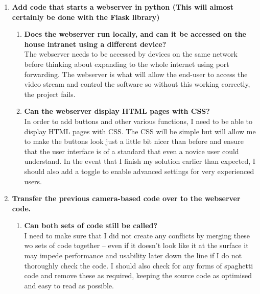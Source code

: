 \documentclass[9pt]{article}
\begin{document}
\begin{small}
\begin{enumerate}
		\item \textbf{Add code that starts a webserver in python (This will almost certainly be done with the Flask library)}
		\begin{enumerate}
			\item \textbf{Does the webserver run locally, and can it be accessed on the house intranet using a different device?}\\
				The webserver needs to be accessed by devices on the same network before thinking about expanding to the whole internet using port forwarding. The webserver is what will allow the end-user to access the video stream and control the software so without this working correctly, the project fails.
			\item \textbf{Can the webserver display HTML pages with CSS?}\\
				In order to add buttons and other various functions, I need to be able to display HTML pages with CSS. The CSS will be simple but will allow me to make the buttons look just a little bit nicer than before and ensure that the user interface is of a standard that even a novice user could understand. In the event that I finish my solution earlier than expected, I should also add a toggle to enable advanced settings for very experienced users.
		\end{enumerate}
		
		\item \textbf{Transfer the previous camera-based code over to the webserver code.}
		\begin{enumerate}
			\item \textbf{Can both sets of code still be called?}\\
				I need to make sure that I did not create any conflicts by merging these wo sets of code together – even if it doesn’t look like it at the surface it may impede performance and usability later down the line if I do not thoroughly check the code. I should also check for any forms of spaghetti code and remove these as required, keeping the source code as optimised and easy to read as possible.
		\end{enumerate}
		

\end{enumerate}
\end{small}
\end{document}
